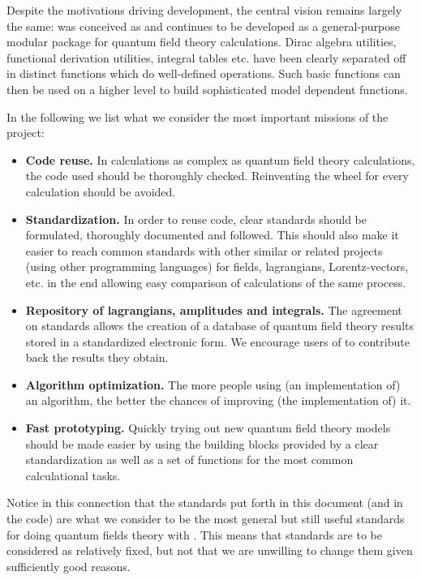 Despite the motivations driving development, the central vision remains largely the same: \fc was conceived as and continues to be developed as a general-purpose modular package for quantum field theory calculations. Dirac algebra utilities, functional derivation utilities, integral tables etc. have been clearly separated off in distinct functions which do well-defined operations.  Such basic functions can then be used  on a higher level to build sophisticated model dependent functions.

In the following we list what we consider the most important missions of the \fc project:

\begin{itemize}

\item{{\bf Code reuse.} In calculations as complex as quantum field theory calculations,
the code used should be thoroughly checked. Reinventing the wheel for every calculation should be avoided.}

\item{{\bf Standardization.} In order to reuse code, clear standards should be formulated, thoroughly documented and followed. This should also make it easier to reach common standards with other similar or related projects (using other programming languages) for fields, lagrangians, Lorentz-vectors, etc. in the end allowing easy comparison of calculations of the same process.}

\item{{\bf Repository of lagrangians, amplitudes and integrals.} The agreement on standards allows the creation of a database of quantum field theory results stored in a standardized electronic form. We encourage users of \fc to contribute back the results they obtain.}

\item{{\bf Algorithm optimization.} The more people using (an implementation of) an algorithm, the better the chances of improving (the implementation of) it.}

\item{{\bf Fast prototyping.} Quickly trying out new quantum field theory models should be made easier by using the building blocks provided by a clear standardization as well as a set of functions for the most common calculational tasks.}

\end{itemize}

Notice in this connection that the standards put forth
in this document (and in the code) are what we consider to be the most general but
still useful standards
for doing quantum fields theory with \mma. This means that standards are
to be considered as relatively fixed, but not that we are unwilling to change them
given sufficiently good reasons.

